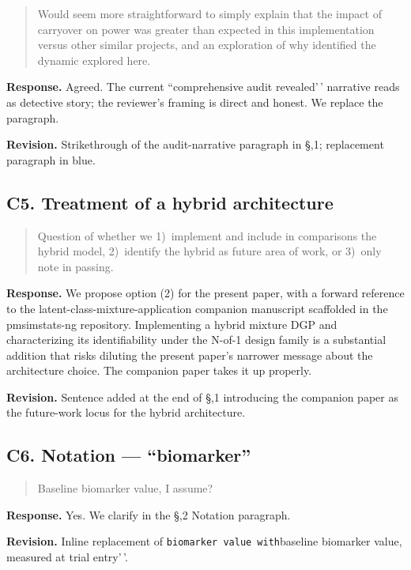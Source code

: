 \documentclass[
]{article}
\begin{document}
\begin{quote}
Would seem more straightforward to simply explain that the impact
of carryover on power was greater than expected in this
implementation versus other similar projects, and an exploration of
why identified the dynamic explored here.
\end{quote}

\textbf{Response.} Agreed. The current ``comprehensive audit
revealed'\,' narrative reads as detective story; the reviewer's
framing is direct and honest. We replace the paragraph.

\textbf{Revision.} Strikethrough of the audit-narrative paragraph
in \S,1; replacement paragraph in blue.

\subsection*{C5. Treatment of a hybrid architecture}

\begin{quote}
Question of whether we 1)~implement and include in comparisons the
hybrid model, 2)~identify the hybrid as future area of work, or
3)~only note in passing.
\end{quote}

\textbf{Response.} We propose option (2) for the present paper,
with a forward reference to the latent-class-mixture-application
companion manuscript scaffolded in the pmsimstats-ng repository.
Implementing a hybrid mixture DGP and characterizing its
identifiability under the N-of-1 design family is a substantial
addition that risks diluting the present paper's narrower message
about the architecture choice. The companion paper takes it up
properly.

\textbf{Revision.} Sentence added at the end of \S,1 introducing
the companion paper as the future-work locus for the hybrid
architecture.

\subsection*{C6. Notation --- ``biomarker''}

\begin{quote}
Baseline biomarker value, I assume?
\end{quote}

\textbf{Response.} Yes. We clarify in the \S,2 Notation paragraph.

\textbf{Revision.} Inline replacement of \texttt{biomarker\ value\textquotesingle{}\textquotesingle{}\ with}baseline biomarker value, measured at trial entry'\,'.
\end{document}
